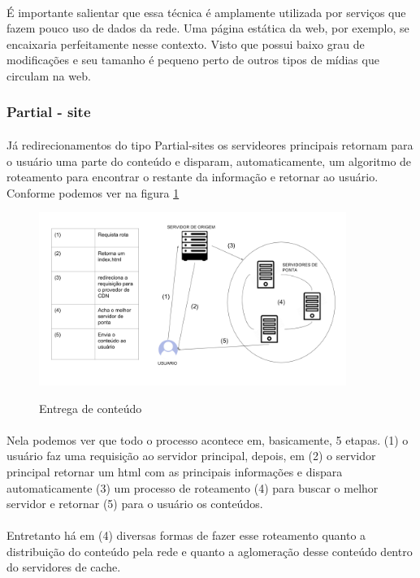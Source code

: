 \paragraph{} \'E importante salientar que essa t\'ecnica \'e amplamente utilizada por servi\c{c}os que fazem pouco uso de dados da rede. Uma p\'agina est\'atica da web, por exemplo, se encaixaria perfeitamente nesse contexto. Visto que possui baixo grau de modifica\c{c}\~oes e seu tamanho \'e pequeno perto de outros tipos de m\'idias que circulam na web.

\subsubsection{Partial - site}
\paragraph{} J\'a redirecionamentos do tipo Partial-sites os servideores principais retornam para o usu\'ario uma parte do conte\'udo e disparam, automaticamente, um algoritmo de roteamento para encontrar o restante da informa\c{c}\~ao e retornar ao usu\'ario. Conforme podemos ver na figura \ref{figura:entrega_conteudo}
\begin{figure}[h]
\caption{Entrega de conte\'udo}
\includegraphics[width=10cm]{Figuras/entrega_conteudo.png} 
\label{figura:entrega_conteudo}
\end{figure}
\paragraph{}  Nela podemos ver que todo o processo acontece em, basicamente, 5 etapas. (1) o usu\'ario faz uma requisi\c{c}\~ao ao servidor principal, depois, em (2) o servidor principal retornar um html com as principais informa\c{c}\~oes e dispara automaticamente (3) um processo de roteamento (4) para buscar o melhor servidor e retornar (5) para o usu\'ario os conte\'udos.
\paragraph{} Entretanto h\'a em (4) diversas formas de fazer esse roteamento quanto a distribui\c{c}\~ao do conte\'udo pela rede e quanto a aglomera\c{c}\~ao desse conte\'udo dentro do servidores de cache. 
